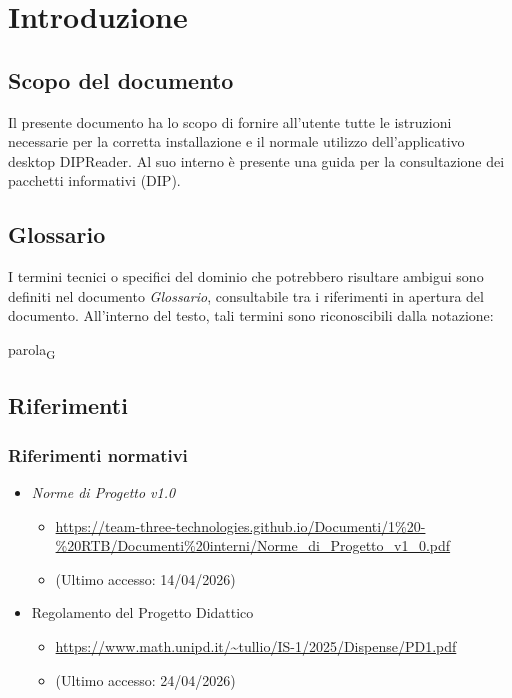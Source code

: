 \documentclass[a4paper,12pt]{article}
\begin{document}
    \section{Introduzione} {
        \subsection{Scopo del documento} {        
            Il presente documento ha lo scopo di fornire all'utente tutte le istruzioni necessarie per la corretta installazione e il normale utilizzo dell'applicativo desktop DIPReader.
            Al suo interno è presente una guida per la consultazione dei pacchetti informativi (DIP).
        }

        \subsection{Glossario}
            I termini tecnici o specifici del dominio che potrebbero risultare ambigui sono definiti nel documento \textit{Glossario}, consultabile tra i riferimenti in apertura del documento. All'interno del testo, tali termini sono 
            riconoscibili dalla notazione:
                \begin{center}
                    parola\textsubscript{G}
                \end{center}
        
        \subsection{Riferimenti} {
            \subsubsection{Riferimenti normativi} {
            \begin{itemize}
                \item \textit{Norme di Progetto v1.0}
                \begin{itemize}
                    \item \url{https://team-three-technologies.github.io/Documenti/1%20-%20RTB/Documenti%20interni/Norme_di_Progetto_v1_0.pdf}
                    \item[] (Ultimo accesso: 14/04/2026)
                \end{itemize}
                \item Regolamento del Progetto Didattico
                \begin{itemize}
                    \item \url{https://www.math.unipd.it/~tullio/IS-1/2025/Dispense/PD1.pdf}
                    \item[] (Ultimo accesso: 24/04/2026)
                \end{itemize}
            \end{itemize}
            }
}}
\end{document}
